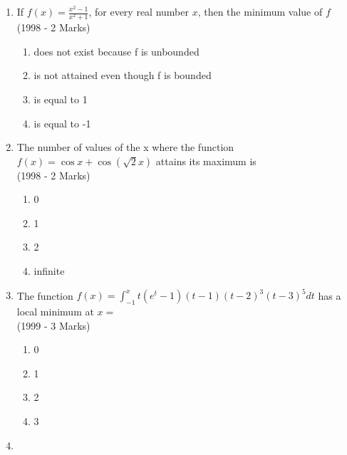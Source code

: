 \documentclass[journal,12pt,twocolumn]{IEEEtran}
\theoremstyle{remark}
\begin{document}
    \begin{enumerate}
    \item{
            If $f(x) =  \frac{x^2-1}{x^2+1}$, for every real number $x$, then the minimum value of $f$ \\ \text{   } \hfill
                {(1998 - 2 Marks)}
            \begin{enumerate}
                \item does not exist because f is unbounded
                \item is not attained even though f is bounded
                \item is equal to 1
                \item is equal to -1
            \end{enumerate} }
    \item{
            The number of values of the x where the function $f(x)=\cos x + \cos(\sqrt{2}x)$ attains its maximum is \\ \text{   } \hfill
                {(1998 - 2 Marks)}
            \begin{multicols}{2}
                \begin{enumerate}
                    \item 0
                    \item 1
                    \item 2
                    \item infinite
                \end{enumerate}
            \end{multicols}
        }
    \item{
     
            The function $f(x)= \int_{-1}^x t(e^t-1)(t-1)(t-2)^3(t-3)^5dt$ has a local minimum at $x=$ \\ \text{   } \hfill
                {(1999 - 3 Marks)}
            \begin{multicols}{2}
                \begin{enumerate}
                    \item 0 
                    \item 1
                    \item 2
                    \item 3
                \end{enumerate}
            \end{multicols}
        
        }
    \item{
        
}
\end{enumerate}
\end{document}
